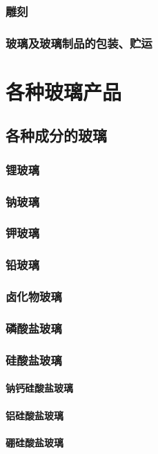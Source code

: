 \documentclass[UTF8]{../../ApplicationUniverse}
\begin{document}
        \subsubsection{雕刻}
        \subsubsection{玻璃及玻璃制品的包装、贮运}
\section{各种玻璃产品}
    \subsection{各种成分的玻璃}
        \subsubsection{锂玻璃}
        \subsubsection{钠玻璃}
        \subsubsection{钾玻璃}
        \subsubsection{铅玻璃}
        \subsubsection{卤化物玻璃}
        \subsubsection{磷酸盐玻璃}
        \subsubsection{硅酸盐玻璃}
            \paragraph{钠钙硅酸盐玻璃}
            \paragraph{铝硅酸盐玻璃}
            \paragraph{硼硅酸盐玻璃}
\end{document}
